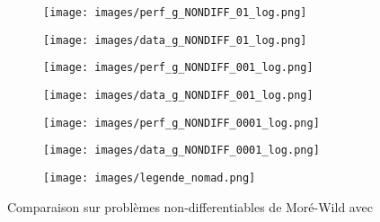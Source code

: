 	\begin{figure}[!htb] %
		\centering
		\begin{subfigure}{0.43\textwidth}
			\texttt{[image: images/perf\_g\_NONDIFF\_01\_log.png]}
		\end{subfigure}%
		\begin{subfigure}{0.43\textwidth}
			\texttt{[image: images/data\_g\_NONDIFF\_01\_log.png]}
		\end{subfigure}
		\smallskip
		\begin{subfigure}{0.43\textwidth}
			\texttt{[image: images/perf\_g\_NONDIFF\_001\_log.png]}
		\end{subfigure}%
		\begin{subfigure}{0.43\textwidth}
			\texttt{[image: images/data\_g\_NONDIFF\_001\_log.png]}
		\end{subfigure}
		\smallskip
		\begin{subfigure}{0.43\textwidth}
			\texttt{[image: images/perf\_g\_NONDIFF\_0001\_log.png]}
		\end{subfigure}%
		\begin{subfigure}{0.43\textwidth}
			\texttt{[image: images/data\_g\_NONDIFF\_0001\_log.png]}
		\end{subfigure}
		\smallskip
		\begin{subfigure}{0.95\textwidth}
			\texttt{[image: images/legende\_nomad.png]}
		\end{subfigure}
		\caption{Comparaison sur problèmes non-differentiables de Moré-Wild avec \CS} \label{fig:1}
	\end{figure}
	\clearpage
